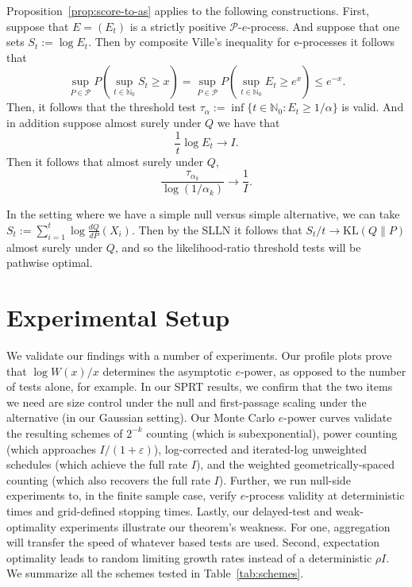 \documentclass{article}
\newcommand{\NN}{\mathbb N}
\newcommand{\Nzero}{\mathbb N_0}
\newcommand{\PP}{\mathcal P}
\newcommand{\KL}{\mathrm{KL}}
\theoremstyle{definition}
\begin{document}
Proposition~\ref{prop:score-to-as} applies to the following constructions. First, suppose that $E=(E_t)$ is a strictly positive $\mathcal P$-$e$-process. And suppose that one sets $S_t:=\log E_t$. Then by composite Ville's inequality for e-processes it follows that
\[
\sup_{P\in\PP}P\left(\sup_{t\in\Nzero}S_t\ge x\right)=\sup_{P\in\PP} P\left(\sup_{t\in\Nzero}E_t\ge e^x\right)\le e^{-x}.
\]
Then, it follows that the threshold test $\tau_\alpha:=\inf\{t\in\NN_0: E_t\ge 1/\alpha\}$ is valid. And in addition suppose almost surely under $Q$ we have that
\[
\frac{1}{t}\log E_t\longrightarrow I.
\]
Then it follows that almost surely under $Q$,
\[
\frac{\tau_{\alpha_k}}{\log(1/\alpha_k)}\longrightarrow \frac{1}{I}.
\]

In the setting where we have a simple null versus simple alternative, we can take $S_t:=\sum_{i=1}^t \log\frac{dQ}{dP}(X_i)$. Then by the SLLN it follows that $S_t/t\to \KL(Q\|P)$ almost surely under $Q$, and so the likelihood-ratio threshold tests will be pathwise optimal.


\section{Experimental Setup}\label{sec:exp1}
We validate our findings with a number of experiments. Our profile plots prove that $\log W(x)/x$ determines the asymptotic $e$-power, as opposed to the number of tests alone, for example. In our SPRT results, we confirm that the two items we need are size control under the null and first-passage scaling under the alternative (in our Gaussian setting). Our Monte Carlo $e$-power curves validate the resulting schemes of $2^{-k}$ counting (which is subexponential), power counting (which approaches $I/(1+\varepsilon)$), log-corrected and iterated-log unweighted schedules (which achieve the full rate $I$), and the weighted geometrically-spaced counting (which also recovers the full rate $I$). Further, we run null-side experiments to, in the finite sample case, verify $e$-process validity at deterministic times and grid-defined stopping times. Lastly, our delayed-test and weak-optimality experiments illustrate our theorem's weakness. For one, aggregation will transfer the speed of whatever based tests are used. Second, expectation optimality leads to random limiting growth rates instead of a deterministic $\rho I$. We summarize all the schemes tested in Table~\ref{tab:schemes}.
\end{document}
